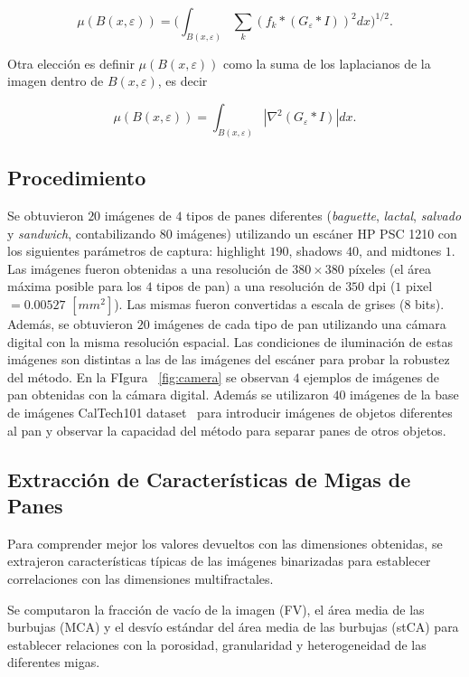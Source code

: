 \begin{equation}
\mu(B(x,\varepsilon)) = (\int_{B(x,\varepsilon)}{\sum_{k}{(f_{k} \ast (G_{\varepsilon} \ast I))^{2}} dx)^{1/2}}.
\label{eqn:gradient}
\end{equation}

Otra elección es definir $\mu(B(x, \varepsilon))$ como la suma de los laplacianos de la imagen dentro de $B(x, \varepsilon)$, es decir

\begin{equation}
\mu(B(x,\varepsilon)) = \int_{B(x,\varepsilon)}|\nabla^2 (G_{\varepsilon} \ast I)| dx.
\label{eqn:laplacian}
\end{equation}

\subsection{Procedimiento}
Se obtuvieron $20$ imágenes de $4$ tipos de panes diferentes ({\em baguette}, {\em lactal}, {\em salvado} y {\em sandwich}, contabilizando $80$ imágenes) utilizando un escáner HP PSC 1210 con los siguientes parámetros de captura:  highlight $190$, shadows $40$, and midtones $1$. Las imágenes fueron obtenidas a una resolución de $380\times 380$ píxeles (el área máxima posible para los $4$ tipos de pan) a una resolución de $350$ dpi ($1$ pixel $= 0.00527$ $[mm^{2}]$). Las mismas fueron convertidas a escala de grises ($8$ bits). Además, se obtuvieron $20$ imágenes de cada tipo de pan utilizando una cámara digital con la misma resolución espacial. Las condiciones de iluminación de estas imágenes son distintas a las de las imágenes del escáner para probar la robustez del método. En la FIgura ~\ref{fig:camera} se observan $4$ ejemplos de imágenes de pan obtenidas con la cámara digital. Además se utilizaron $40$ imágenes de la base de imágenes CalTech101 dataset~\cite{FeiFei04} para introducir imágenes de objetos diferentes al pan y observar la capacidad del método para separar panes de otros objetos.

\subsection{Extracción de Características de Migas de Panes}
Para comprender mejor los valores devueltos con las dimensiones obtenidas, se extrajeron características típicas de las imágenes binarizadas para establecer correlaciones con las dimensiones multifractales.

Se computaron la fracción de vacío de la imagen (FV), el área media de las burbujas (MCA) y el desvío estándar del área media de las burbujas (stCA) para establecer relaciones con la porosidad, granularidad y heterogeneidad de las diferentes migas.


